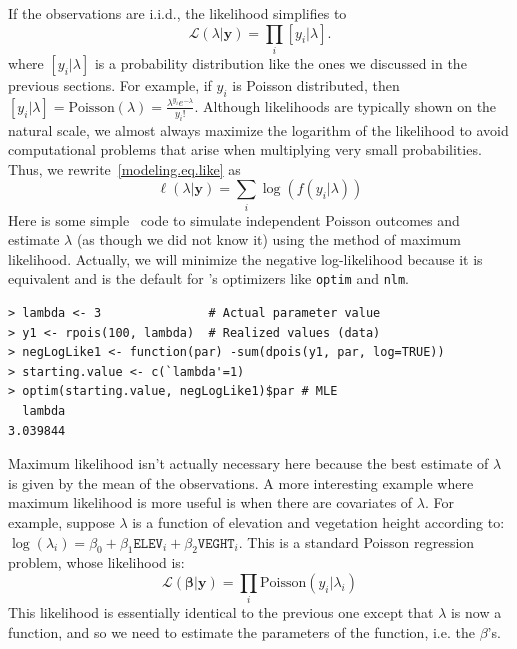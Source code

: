 If the observations are i.i.d., the likelihood simplifies to
\begin{equation}
  \mathcal{L}(\lambda | \mathbf{y}) = \prod_i [y_i | \lambda].
  \label{modeling.eq.like}
\end{equation}
where $[y_i | \lambda]$ is a probability distribution like the ones
we discussed in the previous sections. For example, if $y_i$ is
Poisson distributed, then
$[y_i | \lambda] = \text{Poisson}(\lambda) = \frac{\lambda^{y_i}e^{-\lambda}}{y_i!}$.
Although likelihoods are typically shown on the natural scale, we
almost always maximize the logarithm of the likelihood to
avoid computational problems that arise when multiplying very small
probabilities. Thus, we rewrite~\ref{modeling.eq.like} as
\begin{equation}
  \ell(\lambda | \mathbf{y}) = \sum_i \log(f(y_i | \lambda))
  \label{modeling.eq.like}
\end{equation}
Here is some simple \R~code to simulate independent Poisson outcomes
and estimate $\lambda$ (as though we did not know it) using the
method of maximum likelihood. Actually, we will minimize the negative
log-likelihood because it is equivalent and is the default for \R's
optimizers like \verb+optim+ and \verb+nlm+.
\begin{verbatim}
> lambda <- 3               # Actual parameter value
> y1 <- rpois(100, lambda)  # Realized values (data)
> negLogLike1 <- function(par) -sum(dpois(y1, par, log=TRUE))
> starting.value <- c(`lambda'=1)
> optim(starting.value, negLogLike1)$par # MLE
  lambda
3.039844
\end{verbatim}
Maximum likelihood isn't actually necessary here because the best estimate of
$\lambda$ is given by the mean of the observations. A more interesting
example where maximum likelihood is more useful is when there are
covariates of $\lambda$. For example, suppose $\lambda$ is a function
of elevation and vegetation height according to: $\log(\lambda_i) =
\beta_0 + \beta_1\texttt{ELEV}_i + \beta_2\texttt{VEGHT}_i$. This is a
standard Poisson regression problem, whose likelihood is:
\begin{equation}
  \mathcal{L}(\bm{\beta} | \mathbf{y}) = \prod_i \text{Poisson}(y_i | \lambda_i)
  \label{modeling.eq.like}
\end{equation}
This likelihood is essentially identical to the previous one except
that $\lambda$ is now a function, and so we need to estimate the
parameters of the function, i.e. the $\beta$'s. %

